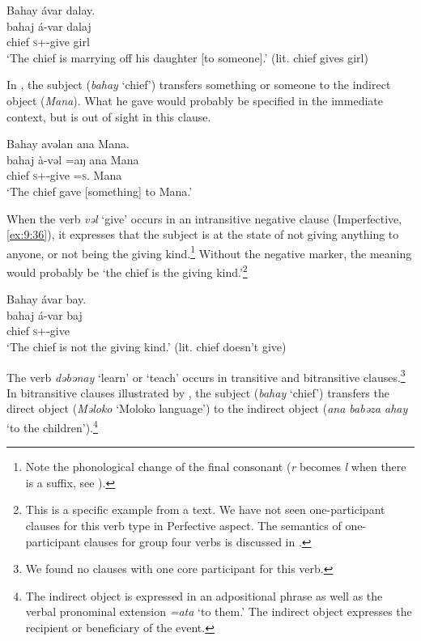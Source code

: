 \ea \label{ex:9:34}
Bahay  ávar  dalay.\\
\gll  bahaj    á-var      dalaj\\
      chief  \textsc{s}+{\IFV}-give  girl\\
\glt   ‘The chief is marrying off his daughter [to someone].’ (lit. chief gives girl) 
\z

In , the subject (\textit{bahay}  ‘chief’) transfers something or someone to the indirect object (\textit{Mana}). What he gave would probably be specified in the immediate context, but is out of sight in this clause.

\ea \label{ex:9:35}
Bahay  avəlan  ana  Mana.\\
\gll  bahaj   à-vəl    =aŋ   ana   Mana\\
      chief  \textsc{s}+{\PFV}-give  =\textsc{s}.{\IO}  {\DAT} Mana\\
\glt  ‘The chief gave [something] to Mana.’
\z

When the verb \textit{vəl}  ‘give’ occurs in an intransitive negative clause (Imperfective, \ref{ex:9:36}), it expresses that the subject is at the state of not giving anything to anyone, or not being the giving kind.\footnote{Note the phonological change of the final consonant (\textit{r} becomes \textit{l} when there is a suffix, see ). } Without the negative marker, the meaning would probably be ‘the chief is the giving kind.’\footnote{This is a specific example from a text. We have not seen one-participant clauses for this verb type in Perfective aspect. %
The semantics of one-participant clauses for group four verbs is discussed in .}

\ea \label{ex:9:36}
Bahay  ávar  bay.\\
\gll  bahaj  á-var       baj\\
      chief  \textsc{s}+{\IFV}-give  {\NEG}\\
\glt  ‘The chief is not the giving kind.’ (lit. chief doesn’t give) 
\z

The verb \textit{dəbənay} ‘learn’ or ‘teach’ occurs in transitive and bitransitive clauses.\footnote{We found no clauses with one core participant for this verb. } In bitransitive clauses illustrated by , the subject (\textit{bahay}  ‘chief’) transfers the direct object (\textit{Məloko} ‘Moloko language’) to the indirect object (\textit{ana babəza ahay} ‘to the children’).\footnote{The indirect object is expressed in an adpositional phrase as well as the verbal pronominal extension \textit{=ata} ‘to them.’ The indirect object expresses the recipient or beneficiary of the event.} 

